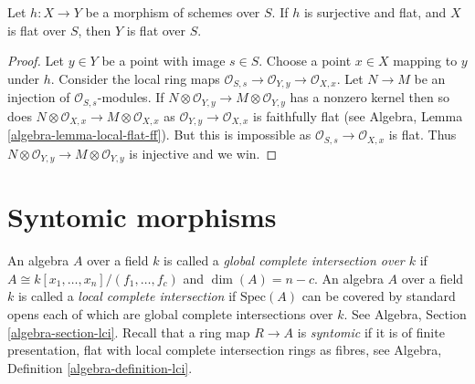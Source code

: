 \begin{lemma}
\label{lemma-flat-permanence}
Let $h : X \to Y$ be a morphism of schemes over $S$.
If $h$ is surjective and flat, and $X$ is flat over $S$, then
$Y$ is flat over $S$.
\end{lemma}

\begin{proof}
Let $y \in Y$ be a point with image $s \in S$.
Choose a point $x \in X$ mapping to $y$ under $h$.
Consider the local ring maps
$\mathcal{O}_{S, s} \to \mathcal{O}_{Y, y} \to \mathcal{O}_{X, x}$.
Let $N \to M$ be an injection of $\mathcal{O}_{S, s}$-modules.
If $N \otimes \mathcal{O}_{Y, y} \to M \otimes \mathcal{O}_{Y, y}$
has a nonzero kernel then so does
$N \otimes \mathcal{O}_{X, x} \to M \otimes \mathcal{O}_{X, x}$
as $\mathcal{O}_{Y, y} \to \mathcal{O}_{X, x}$ is faithfully flat
(see Algebra, Lemma \ref{algebra-lemma-local-flat-ff}). But this is
impossible as $\mathcal{O}_{S, s} \to \mathcal{O}_{X, x}$ is flat.
Thus $N \otimes \mathcal{O}_{Y, y} \to M \otimes \mathcal{O}_{Y, y}$
is injective and we win.
\end{proof}















\section{Syntomic morphisms}
\label{section-syntomic}

\noindent
An algebra $A$ over a field $k$ is called a
{\it global complete intersection over $k$}
if $A \cong k[x_1, \ldots, x_n]/(f_1, \ldots, f_c)$ and
$\dim(A) = n - c$. An algebra $A$ over a field $k$ is called a
{\it local complete intersection} if $\text{Spec}(A)$
can be covered by standard opens each of which are global
complete intersections over $k$. See Algebra, Section
\ref{algebra-section-lci}. Recall that a ring map $R \to A$
is {\it syntomic} if it is of finite presentation,
flat with local complete intersection rings as fibres,
see Algebra, Definition \ref{algebra-definition-lci}.

